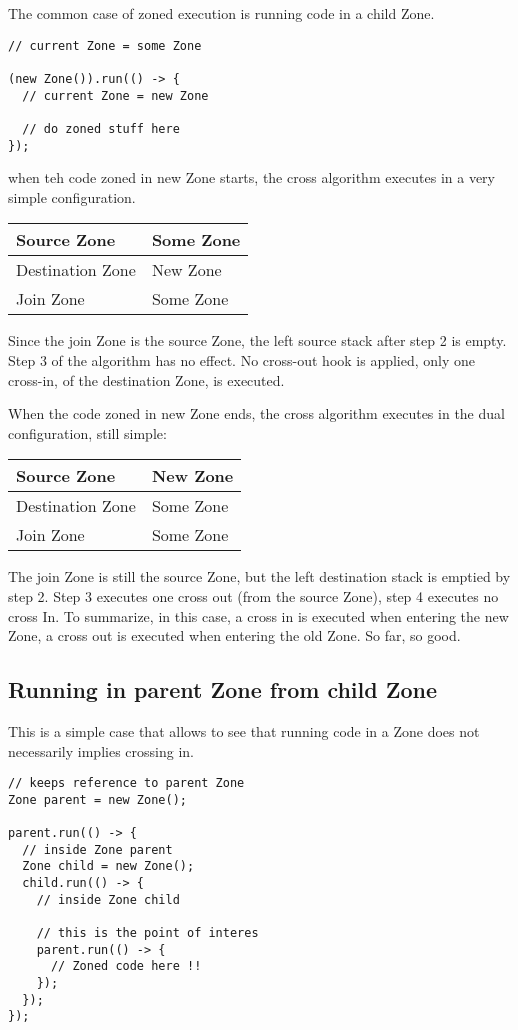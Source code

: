 The common case of zoned execution is running code in a child Zone.

\begin{lstlisting}
// current Zone = some Zone

(new Zone()).run(() -> {
  // current Zone = new Zone

  // do zoned stuff here
});
\end{lstlisting}

when teh code zoned in new Zone starts, the cross algorithm executes in a very simple configuration.

\begin{tabular}{| l | l |}
\hline
Source Zone & Some Zone \\ \hline
Destination Zone & New Zone \\ \hline
Join Zone & Some Zone \\ \hline
\end{tabular}

Since the join Zone is the source Zone, the left source stack after step 2 is empty. Step 3 of the algorithm has no effect. No cross-out hook is applied, only one cross-in, of the destination Zone, is executed.

When the code zoned in new Zone ends, the cross algorithm executes in the dual configuration, still simple:

\begin{tabular}{| l | l |}
\hline
Source Zone & New Zone \\ \hline
Destination Zone & Some Zone \\ \hline
Join Zone & Some Zone \\ \hline
\end{tabular}

The join Zone is still the source Zone, but the left destination stack is emptied by step 2. Step 3 executes one cross out (from the source Zone), step 4 executes no cross In. To summarize, in this case, a cross in is executed when entering the new Zone, a cross out is executed when entering the old Zone. So far, so good.

\subsection*{Running in parent Zone from child Zone}

This is a simple case that allows to see that running code in a Zone does not necessarily implies crossing in.

\begin{lstlisting}
// keeps reference to parent Zone
Zone parent = new Zone();

parent.run(() -> {
  // inside Zone parent
  Zone child = new Zone();
  child.run(() -> {
    // inside Zone child

    // this is the point of interes
    parent.run(() -> {
      // Zoned code here !!
    });
  });
});
\end{lstlisting}

